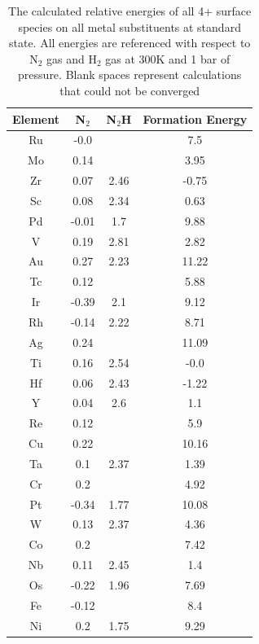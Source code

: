 \begin{table}
\begin{center}
\begin{tabular}{| c | c | c | c |}
\hline
Element & N$_2$ & N$_2$H & Formation Energy \\
\hline
Ru & -0.0 &  & 7.5 \\
Mo & 0.14 &  & 3.95 \\
Zr & 0.07 & 2.46 & -0.75 \\
Sc & 0.08 & 2.34 & 0.63 \\
Pd & -0.01 & 1.7 & 9.88 \\
V & 0.19 & 2.81 & 2.82 \\
Au & 0.27 & 2.23 & 11.22 \\
Tc & 0.12 &  & 5.88 \\
Ir & -0.39 & 2.1 & 9.12 \\
Rh & -0.14 & 2.22 & 8.71 \\
Ag & 0.24 &  & 11.09 \\
Ti & 0.16 & 2.54 & -0.0 \\
Hf & 0.06 & 2.43 & -1.22 \\
Y & 0.04 & 2.6 & 1.1 \\
Re & 0.12 &  & 5.9 \\
Cu & 0.22 &  & 10.16 \\
Ta & 0.1 & 2.37 & 1.39 \\
Cr & 0.2 &  & 4.92 \\
Pt & -0.34 & 1.77 & 10.08 \\
W & 0.13 & 2.37 & 4.36 \\
Co & 0.2 &  & 7.42 \\
Nb & 0.11 & 2.45 & 1.4 \\
Os & -0.22 & 1.96 & 7.69 \\
Fe & -0.12 &  & 8.4 \\
Ni & 0.2 & 1.75 & 9.29 \\
\hline
\end{tabular}
\end{center}
\caption{The calculated relative energies of all 4+ surface species on all metal substituents at standard state. All energies are referenced with respect to N$_2$ gas and H$_2$ gas at 300K and 1 bar of pressure. Blank spaces represent calculations that could not be converged}
\hline
\end{table}

